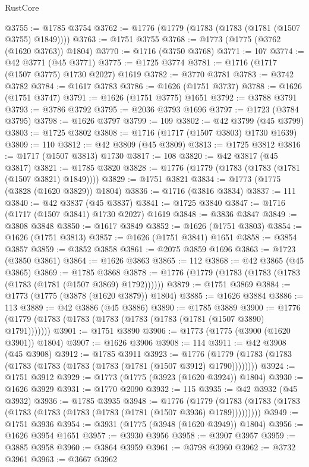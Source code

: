 \begin{lexlean}{RustCore}
\begin{coremodule}
@3755 := @1785 @3754
@3762 := @1776 (@1779 (@1783 (@1783 (@1781 (@1507 @3755) @1849))))
@3763 := @1751 @3755
@3768 := @1773 (@1775 (@3762 (@1620 @3763)) @1804)
@3770 := @1716 (@3750 @3768)
@3771 := 107
@3774 := @42 @3771 (@45 @3771)
@3775 := @1725 @3774
@3781 := @1716 (@1717 (@1507 @3775) @1730 @2027) @1619
@3782 := @3770 @3781
@3783 := @3742 @3782
@3784 := @1617 @3783
@3786 := @1626 (@1751 @3737)
@3788 := @1626 (@1751 @3747)
@3791 := @1626 (@1751 @3775) @1651
@3792 := @3788 @3791
@3793 := @3786 @3792
@3795 := @2036 @3793 @1696
@3797 := @1723 (@3784 @3795)
@3798 := @1626 @3797
@3799 := 109
@3802 := @42 @3799 (@45 @3799)
@3803 := @1725 @3802
@3808 := @1716 (@1717 (@1507 @3803) @1730 @1639)
@3809 := 110
@3812 := @42 @3809 (@45 @3809)
@3813 := @1725 @3812
@3816 := @1717 (@1507 @3813) @1730
@3817 := 108
@3820 := @42 @3817 (@45 @3817)
@3821 := @1785 @3820
@3828 := @1776 (@1779 (@1783 (@1783 (@1781 (@1507 @3821) @1849))))
@3829 := @1751 @3821
@3834 := @1773 (@1775 (@3828 (@1620 @3829)) @1804)
@3836 := @1716 (@3816 @3834)
@3837 := 111
@3840 := @42 @3837 (@45 @3837)
@3841 := @1725 @3840
@3847 := @1716 (@1717 (@1507 @3841) @1730 @2027) @1619
@3848 := @3836 @3847
@3849 := @3808 @3848
@3850 := @1617 @3849
@3852 := @1626 (@1751 @3803)
@3854 := @1626 (@1751 @3813)
@3857 := @1626 (@1751 @3841) @1651
@3858 := @3854 @3857
@3859 := @3852 @3858
@3861 := @2075 @3859 @1696
@3863 := @1723 (@3850 @3861)
@3864 := @1626 @3863
@3865 := 112
@3868 := @42 @3865 (@45 @3865)
@3869 := @1785 @3868
@3878 := @1776 (@1779 (@1783 (@1783 (@1783 (@1783 (@1781 (@1507 @3869) @1792))))))
@3879 := @1751 @3869
@3884 := @1773 (@1775 (@3878 (@1620 @3879)) @1804)
@3885 := @1626 @3884
@3886 := 113
@3889 := @42 @3886 (@45 @3886)
@3890 := @1785 @3889
@3900 := @1776 (@1779 (@1783 (@1783 (@1783 (@1783 (@1783 (@1781 (@1507 @3890) @1791)))))))
@3901 := @1751 @3890
@3906 := @1773 (@1775 (@3900 (@1620 @3901)) @1804)
@3907 := @1626 @3906
@3908 := 114
@3911 := @42 @3908 (@45 @3908)
@3912 := @1785 @3911
@3923 := @1776 (@1779 (@1783 (@1783 (@1783 (@1783 (@1783 (@1783 (@1781 (@1507 @3912) @1790))))))))
@3924 := @1751 @3912
@3929 := @1773 (@1775 (@3923 (@1620 @3924)) @1804)
@3930 := @1626 @3929
@3931 := @1770 @2090
@3932 := 115
@3935 := @42 @3932 (@45 @3932)
@3936 := @1785 @3935
@3948 := @1776
    (@1779 (@1783 (@1783 (@1783 (@1783 (@1783 (@1783 (@1783 (@1781 (@1507 @3936) @1789)))))))))
@3949 := @1751 @3936
@3954 := @3931 (@1775 (@3948 (@1620 @3949)) @1804)
@3956 := @1626 @3954 @1651
@3957 := @3930 @3956
@3958 := @3907 @3957
@3959 := @3885 @3958
@3960 := @3864 @3959
@3961 := @3798 @3960
@3962 := @3732 @3961
@3963 := @3667 @3962

\end{coremodule}
\end{lexlean}
